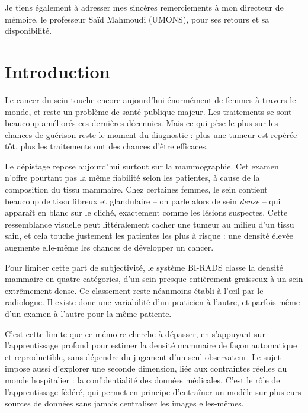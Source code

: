 \documentclass[12pt,a4paper]{report}
\begin{document}
Je tiens également à adresser mes sincères remerciements à mon directeur
de mémoire, le professeur Saïd Mahmoudi (UMONS), pour ses retours et sa
disponibilité.

\tableofcontents

\chapter*{Introduction}

Le cancer du sein touche encore aujourd'hui énormément de femmes à travers
le monde, et reste un problème de santé publique majeur. Les traitements se
sont beaucoup améliorés ces dernières décennies. Mais ce qui pèse le plus
sur les chances de guérison reste le moment du diagnostic : plus une tumeur
est repérée tôt, plus les traitements ont des chances d'être efficaces.

Le dépistage repose aujourd'hui surtout sur la mammographie. Cet examen
n'offre pourtant pas la même fiabilité selon les patientes, à cause de la
composition du tissu mammaire. Chez certaines femmes, le sein contient
beaucoup de tissu fibreux et glandulaire -- on parle alors de sein
\emph{dense} -- qui apparaît en blanc sur le cliché, exactement comme les
lésions suspectes. Cette ressemblance visuelle peut littéralement cacher une
tumeur au milieu d'un tissu sain, et cela touche justement les patientes les
plus à risque : une densité élevée augmente elle-même les chances de
développer un cancer.

Pour limiter cette part de subjectivité, le système BI-RADS classe la
densité mammaire en quatre catégories, d'un sein presque entièrement
graisseux à un sein extrêmement dense. Ce classement reste néanmoins établi
à l'œil par le radiologue. Il existe donc une variabilité d'un praticien à
l'autre, et parfois même d'un examen à l'autre pour la même patiente.

C'est cette limite que ce mémoire cherche à dépasser, en s'appuyant sur
l'apprentissage profond pour estimer la densité mammaire de façon
automatique et reproductible, sans dépendre du jugement d'un seul
observateur. Le sujet impose aussi d'explorer une seconde dimension, liée
aux contraintes réelles du monde hospitalier : la confidentialité des
données médicales. C'est le rôle de l'apprentissage fédéré, qui permet en
principe d'entraîner un modèle sur plusieurs sources de données sans jamais
centraliser les images elles-mêmes.
\end{document}
